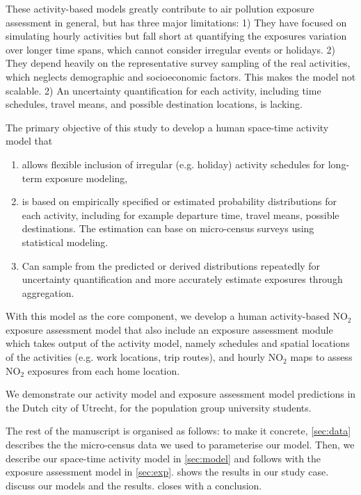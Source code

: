 \documentclass[]{article}
\begin{document}
These activity-based models greatly contribute to air pollution exposure assessment in general, but has three major limitations: 1) They have focused on simulating hourly activities but fall short at quantifying the exposures variation over longer time spans, which cannot consider irregular events or holidays. 
2) They depend heavily on the representative survey sampling of the real activities, which neglects demographic and socioeconomic factors. This makes the model not scalable. 
2) An uncertainty quantification for each activity, including time schedules, travel means, and possible destination locations, is lacking.  

The primary objective of this study to develop a human space-time activity model that 
\begin{enumerate}
    \item allows flexible inclusion of irregular (e.g. holiday) activity schedules for long-term exposure modeling, 
    
    \item is based on empirically specified or estimated probability distributions for each activity, including for example departure time, travel means, possible destinations. The estimation can base on micro-census surveys using statistical modeling.
    
    \item Can sample from the predicted or derived distributions repeatedly for uncertainty quantification and more accurately estimate exposures through aggregation. 
\end{enumerate}

With this model as the core component, we develop a human activity-based NO$_2$ exposure assessment model that also include an exposure assessment module which takes output of the activity model, namely schedules and spatial locations of the activities (e.g. work locations, trip routes), and hourly NO$_2$ maps to assess NO$_2$ exposures from each home location.     

We demonstrate our activity model and exposure assessment model predictions in the Dutch city of Utrecht, for the population group university students.  

The rest of the manuscript is organised as follows: to make it concrete,  \cref{sec:data} describes the the micro-census data we used to parameterise our model. Then, we describe our space-time activity model in \cref{sec:model} and follows with the exposure assessment model in \cref{sec:exp}.  shows the results in our study case.  discuss our models and the results.  closes with a conclusion.
\end{document}
